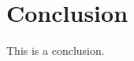 \documentclass[e-only,10pt,reqno]{ofj}
\newcommand{\authorcontributions}[1]{%
\vspace{6pt}\noindent{\fontsize{9}{11.2}\selectfont\textbf{Author Contributions:} {#1}\par}}
\begin{document}
\section{Conclusion}

This is a conclusion.


\ifdefined\review
\else
%



\fi


%
%




\end{document}
